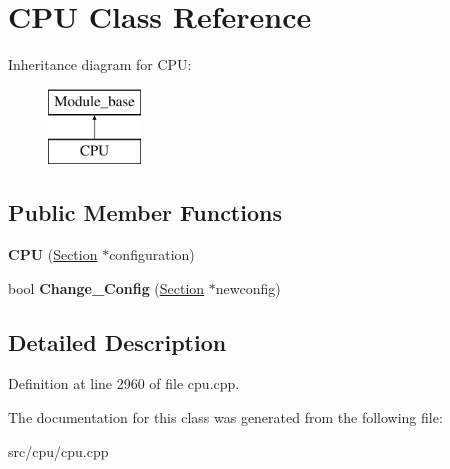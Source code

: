 \hypertarget{classCPU}{\section{C\-P\-U Class Reference}
\label{classCPU}
}
Inheritance diagram for C\-P\-U\-:\begin{figure}[H]
\begin{center}
\leavevmode
\includegraphics[height=2.000000cm]{classCPU}
\end{center}
\end{figure}
\subsection*{Public Member Functions}
\begin{DoxyCompactItemize}
\item 
\hypertarget{classCPU_a7ff8bd1e2634ffa09329984eb00fb890}{{\bfseries C\-P\-U} (\hyperlink{classSection}{Section} $\ast$configuration)}\label{classCPU_a7ff8bd1e2634ffa09329984eb00fb890}

\item 
\hypertarget{classCPU_a84dcaf3dac834731a61c49cacc77f910}{bool {\bfseries Change\-\_\-\-Config} (\hyperlink{classSection}{Section} $\ast$newconfig)}\label{classCPU_a84dcaf3dac834731a61c49cacc77f910}

\end{DoxyCompactItemize}


\subsection{Detailed Description}


Definition at line 2960 of file cpu.\-cpp.



The documentation for this class was generated from the following file\-:\begin{DoxyCompactItemize}
\item 
src/cpu/cpu.\-cpp\end{DoxyCompactItemize}
